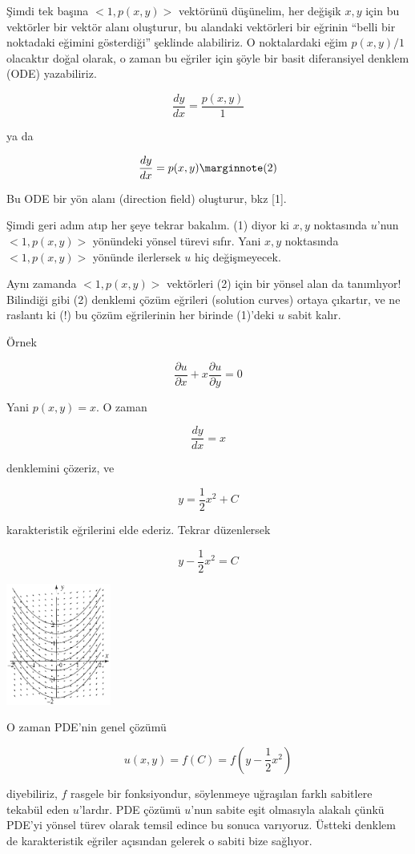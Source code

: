\documentclass[12pt,fleqn]{article}\usepackage{../../common}
\begin{document}
Şimdi tek başına $<1,p(x,y)>$ vektörünü düşünelim, her değişik $x,y$ için
bu vektörler bir vektör alanı oluşturur, bu alandaki vektörleri bir eğrinin
``belli bir noktadaki eğimini gösterdiği'' şeklinde alabiliriz. O
noktalardaki eğim $p(x,y) / 1$ olacaktır doğal olarak, o zaman bu eğriler
için şöyle bir basit diferansiyel denklem (ODE) yazabiliriz.

$$ \frac{dy}{dx} = \frac{p(x,y)}{1} $$

ya da

$$ \frac{dy}{dx} = p(x,y) 
\mlabel{2}
$$

Bu ODE bir yön alanı (direction field) oluşturur, bkz [1].

Şimdi geri adım atıp her şeye tekrar bakalım. (1) diyor ki $x,y$ noktasında
$u$'nun $<1,p(x,y)>$ yönündeki yönsel türevi sıfır. Yani $x,y$ noktasında
$<1,p(x,y)>$ yönünde ilerlersek $u$ hiç değişmeyecek. 

Aynı zamanda $<1,p(x,y)>$ vektörleri (2) için bir yönsel alan da
tanımlıyor!  Bilindiği gibi (2) denklemi çözüm eğrileri (solution curves)
ortaya çıkartır, ve ne raslantı ki (!) bu çözüm eğrilerinin her birinde
(1)'deki $u$ sabit kalır. 

Örnek 

$$ \frac{\partial u}{\partial x} + 
x \frac{\partial u}{\partial y} = 0 
 $$

Yani $p(x,y) = x$. O zaman 

$$ \frac{dy}{dx} = x $$

denklemini çözeriz, ve 

$$ y = \frac{1}{2}x^2 + C $$

karakteristik eğrilerini elde ederiz. Tekrar düzenlersek

$$ y - \frac{1}{2}x^2 = C $$

\includegraphics[height=4cm]{2_1.png}

O zaman PDE'nin genel çözümü 

$$ u(x,y) = f(C) = f(y - \frac{1}{2}x^2) $$

diyebiliriz, $f$ rasgele bir fonksiyondur, söylenmeye uğraşılan farklı
sabitlere tekabül eden $u$'lardır. PDE çözümü $u$'nun sabite eşit olmasıyla
alakalı çünkü PDE'yi yönsel türev olarak temsil edince bu sonuca
varıyoruz. Üstteki denklem de karakteristik eğriler açısından gelerek o
sabiti bize sağlıyor.
\end{document}
